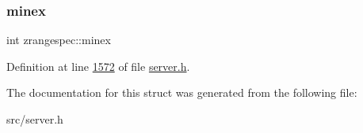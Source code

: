 \subsubsection{\texorpdfstring{minex}{minex}}
{\footnotesize\ttfamily int zrangespec\+::minex}



Definition at line \hyperlink{server_8h_source_l01572}{1572} of file \hyperlink{server_8h_source}{server.\+h}.



The documentation for this struct was generated from the following file\+:\begin{DoxyCompactItemize}
\item 
src/server.\+h\end{DoxyCompactItemize}
